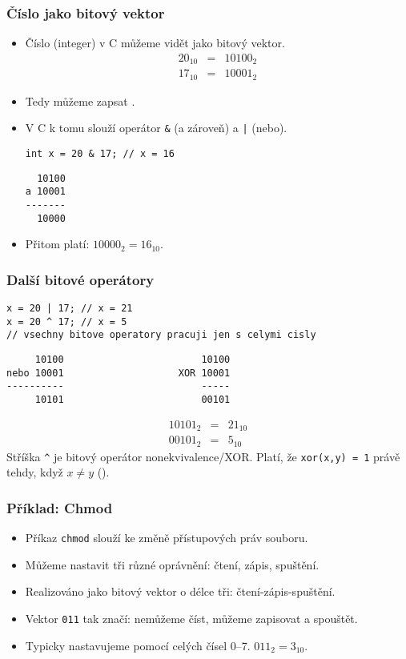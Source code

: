 \documentclass{beamer}
\newenvironment{itemizex}%
  {\large \begin{itemize}%
    \setlength{\itemsep}{8pt}%
    \setlength{\parskip}{8pt}}%
  {\end{itemize}}
\begin{document}
\begin{frame}[t,fragile]\frametitle{Číslo jako bitový vektor} 
    \begin{itemize}
        \item Číslo (integer) v C můžeme vidět jako bitový vektor.
\begin{eqnarray*}
20_{10} &=& 10100_2\\
17_{10} &=& 10001_2
\end{eqnarray*}
        \item Tedy můžeme zapsat . 
        \item V C k tomu slouží operátor \texttt{\&} (a zároveň) a \texttt{|} (nebo).
\begin{verbatim} 
int x = 20 & 17; // x = 16
\end{verbatim}
\begin{verbatim}
  10100
a 10001
-------
  10000
\end{verbatim}
        \item Přitom platí: $10000_2=16_{10}$.
    \end{itemize}
\end{frame}


\begin{frame}[t,fragile]\frametitle{Další bitové operátory} 
\begin{verbatim} 
x = 20 | 17; // x = 21
x = 20 ^ 17; // x = 5
// vsechny bitove operatory pracuji jen s celymi cisly
\end{verbatim}

\begin{verbatim}
     10100                        10100
nebo 10001                    XOR 10001
----------                        -----
     10101                        00101
\end{verbatim}
\begin{eqnarray*}
10101_2 &=& 21_{10}\\
00101_2 &=& 5_{10}
\end{eqnarray*}
    Stříška \texttt{\^} je bitový operátor nonekvivalence/XOR. Platí, že \texttt{xor(x,y) = 1} právě tehdy, když $x \ne y$ ().
\end{frame}


\begin{frame}[t,fragile]\frametitle{Příklad: Chmod} 
    \begin{itemizex}
        \item Příkaz \texttt{chmod} slouží ke změně přístupových práv souboru. 
        \item Můžeme nastavit tři různé oprávnění: čtení, zápis, spuštění. 
        \item Realizováno jako bitový vektor o délce tři: čtení-zápis-spuštění. 
        \item Vektor \texttt{011} tak značí: nemůžeme číst, můžeme zapisovat a spouštět.
        \item Typicky nastavujeme pomocí celých čísel 0--7. $011_2=3_{10}$.
    \end{itemizex}
\end{frame}
\end{document}
